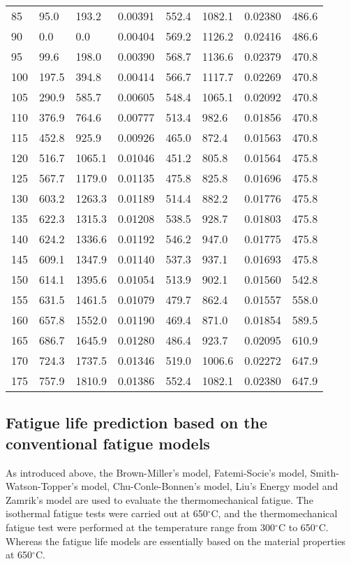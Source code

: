 \begin{table}[htbp]
\begin{tabular}{p{1.5cm}p{1.5cm}p{1.5cm}p{1.5cm}p{1.5cm}p{1.5cm}p{1.5cm}p{1.5cm}}
    85    & 95.0  & 193.2  & 0.00391  & 552.4  & 1082.1  & 0.02380  & 486.6  \\
    90    & 0.0   & 0.0   & 0.00404  & 569.2  & 1126.2  & 0.02416  & 486.6  \\
    95    & 99.6  & 198.0  & 0.00390  & 568.7  & 1136.6  & 0.02379  & 470.8  \\
    100   & 197.5  & 394.8  & 0.00414  & 566.7  & 1117.7  & 0.02269  & 470.8  \\
    105   & 290.9  & 585.7  & 0.00605  & 548.4  & 1065.1  & 0.02092  & 470.8  \\
    110   & 376.9  & 764.6  & 0.00777  & 513.4  & 982.6  & 0.01856  & 470.8  \\
    115   & 452.8  & 925.9  & 0.00926  & 465.0  & 872.4  & 0.01563  & 470.8  \\
    120   & 516.7  & 1065.1  & 0.01046  & 451.2  & 805.8  & 0.01564  & 475.8  \\
    125   & 567.7  & 1179.0  & 0.01135  & 475.8  & 825.8  & 0.01696  & 475.8  \\
    130   & 603.2  & 1263.3  & 0.01189  & 514.4  & 882.2  & 0.01776  & 475.8  \\
    135   & 622.3  & 1315.3  & 0.01208  & 538.5  & 928.7  & 0.01803  & 475.8  \\
    140   & 624.2  & 1336.6  & 0.01192  & 546.2  & 947.0  & 0.01775  & 475.8  \\
    145   & 609.1  & 1347.9  & 0.01140  & 537.3  & 937.1  & 0.01693  & 475.8  \\
    150   & 614.1  & 1395.6  & 0.01054  & 513.9  & 902.1  & 0.01560  & 542.8  \\
    155   & 631.5  & 1461.5  & 0.01079  & 479.7  & 862.4  & 0.01557  & 558.0  \\
    160   & 657.8  & 1552.0  & 0.01190  & 469.4  & 871.0  & 0.01854  & 589.5  \\
    165   & 686.7  & 1645.9  & 0.01280  & 486.4  & 923.7  & 0.02095  & 610.9  \\
    170   & 724.3  & 1737.5  & 0.01346  & 519.0  & 1006.6  & 0.02272  & 647.9  \\
    175   & 757.9  & 1810.9  & 0.01386  & 552.4  & 1082.1  & 0.02380  & 647.9  \\
    \bottomrule
    \end{tabular}%
  \label{Tab:stress_on_material_plane}%
\end{table}%

\subsection{Fatigue life prediction based on the conventional fatigue models}
\noindent
As introduced above, the Brown-Miller's model, Fatemi-Socie's model, Smith-Watson-Topper's model, Chu-Conle-Bonnen's model, Liu's Energy model and Zamrik's model are used to evaluate the thermomechanical fatigue. The isothermal fatigue tests were carried out at 650$^\circ$C, and the thermomechanical fatigue test were performed at the temperature range from 300$^\circ$C to 650$^\circ$C.
Whereas the fatigue life models are essentially based on the material properties at 650$^\circ$C.

